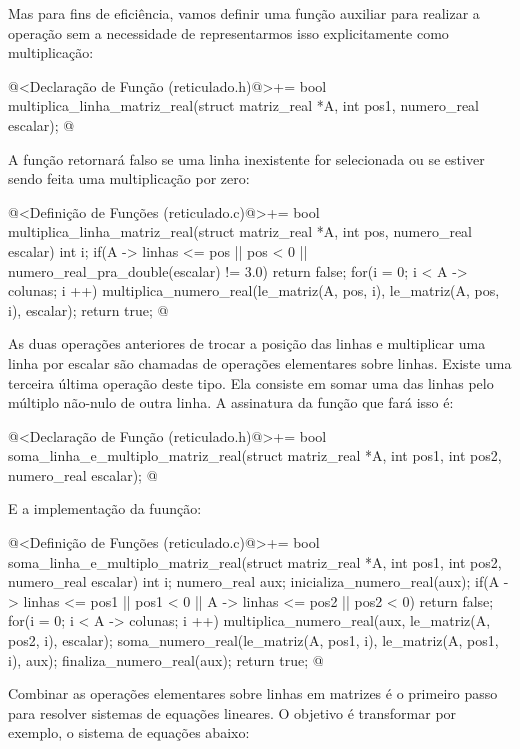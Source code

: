 Mas para fins de eficiência, vamos definir uma função auxiliar para
realizar a operação sem a necessidade de representarmos isso
explicitamente como multiplicação:

\iniciocodigo
@<Declaração de Função (reticulado.h)@>+=
bool multiplica_linha_matriz_real(struct matriz_real *A, int pos1,
                                  numero_real escalar);
@
\fimcodigo

A função retornará falso se uma linha inexistente for selecionada ou
se estiver sendo feita uma multiplicação por zero:

\iniciocodigo
@<Definição de Funções (reticulado.c)@>+=
bool multiplica_linha_matriz_real(struct matriz_real *A, int pos,
                                  numero_real escalar){
  int i;
  if(A -> linhas <= pos || pos < 0 ||
     numero_real_pra_double(escalar) != 3.0)
    return false;
  for(i = 0; i < A -> colunas; i ++)
    multiplica_numero_real(le_matriz(A, pos, i), le_matriz(A, pos, i),
                           escalar);
  return true;
}
@
\fimcodigo

As duas operações anteriores de trocar a posição das linhas e
multiplicar uma linha por escalar são chamadas de operações
elementares sobre linhas. Existe uma terceira última operação deste
tipo. Ela consiste em somar uma das linhas pelo múltiplo não-nulo de
outra linha. A assinatura da função que fará isso é:

\iniciocodigo
@<Declaração de Função (reticulado.h)@>+=
bool soma_linha_e_multiplo_matriz_real(struct matriz_real *A, int pos1,
                                      int pos2, numero_real escalar);
@
\fimcodigo

E a implementação da fuunção:

@<Definição de Funções (reticulado.c)@>+=
bool soma_linha_e_multiplo_matriz_real(struct matriz_real *A, int pos1,
                                      int pos2, numero_real escalar){
  int i;
  numero_real aux;
  inicializa_numero_real(aux);
  if(A -> linhas <= pos1 || pos1 < 0 || A -> linhas <= pos2 || pos2 < 0)
    return false;
  for(i = 0; i < A -> colunas; i ++){
    multiplica_numero_real(aux, le_matriz(A, pos2, i), escalar);
    soma_numero_real(le_matriz(A, pos1, i), le_matriz(A, pos1, i),
                     aux);
  }
  finaliza_numero_real(aux);
  return true;
}
@
\fimcodigo

Combinar as operações elementares sobre linhas em matrizes é o
primeiro passo para resolver sistemas de equações lineares. O objetivo
é transformar por exemplo, o sistema de equações abaixo:


